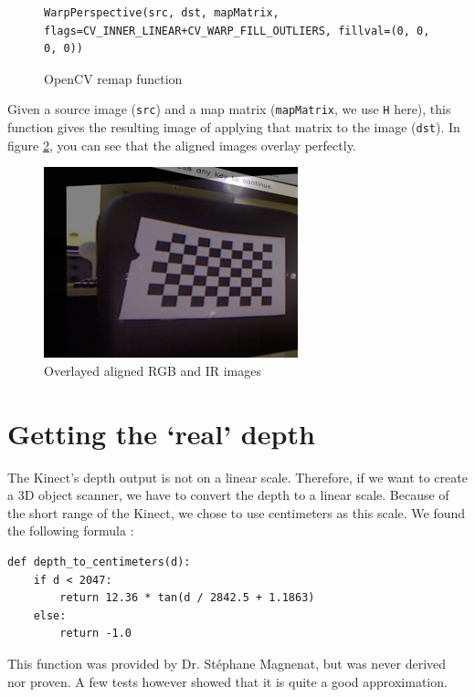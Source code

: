 \begin{figure}[H]
\begin{lstlisting}
WarpPerspective(src, dst, mapMatrix, flags=CV_INNER_LINEAR+CV_WARP_FILL_OUTLIERS, fillval=(0, 0, 0, 0))
\end{lstlisting}
\caption{OpenCV remap function}
\label{code:warpperspective}
\end{figure}

Given a source image (\verb|src|) and a map matrix (\verb|mapMatrix|, we use \verb|H| here), this function gives the resulting image of applying that matrix to the image (\verb|dst|). In figure \ref{fig:aligned}, you can see that the aligned images overlay perfectly.

\begin{figure}[H]
\centering
\includegraphics[scale=0.6]{images/aligned.png}
\caption{Overlayed aligned RGB and IR images}
\label{fig:aligned}
\end{figure}


\section{Getting the `real' depth}
The Kinect's depth output is not on a linear scale. Therefore, if we want to create a 3D object scanner, we have to convert the depth to a linear scale. Because of the short range of the Kinect, we chose to use centimeters as this scale. We found the following formula \cite{MAGNENAT}:
\newpage
\begin{lstlisting}
def depth_to_centimeters(d):
    if d < 2047:
        return 12.36 * tan(d / 2842.5 + 1.1863)
    else:
        return -1.0
\end{lstlisting}
This function was provided by Dr. St\'ephane Magnenat, but was never derived nor proven. A few tests however showed that it is quite a good approximation.

